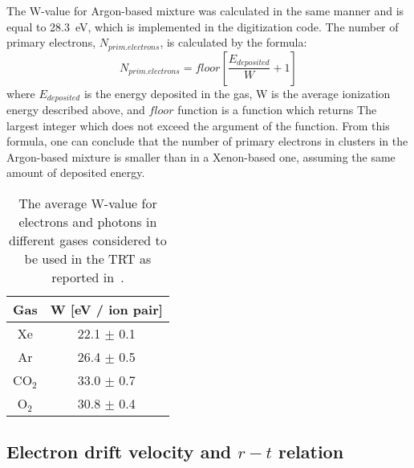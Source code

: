 The W-value for Argon-based mixture was calculated in the same manner and is equal to 28.3~eV, which is implemented in the digitization code.
The number of primary electrons, $N_{prim.electrons}$, is calculated by the formula:
\begin{equation}
 N_{prim.electrons} = floor \left[\dfrac{E_{deposited}}{W} + 1\right]
\end{equation}
where $E_{deposited}$ is the energy deposited in the gas, W is the average ionization energy described above, and $floor$ function is a function which returns
The largest integer which does not exceed the argument of the function.
From this formula, one can conclude that the number of primary electrons in clusters in the Argon-based mixture is smaller than in a Xenon-based one, 
assuming the same amount of deposited energy.

\begin{table}[p]
  \begin{tabular}{c|c}
    Gas & W [eV / ion pair]\\
    \hline
    Xe & 22.1 $\pm$ 0.1 \\
    Ar & 26.4 $\pm$ 0.5 \\
    CO$_2$ & 33.0 $\pm$ 0.7 \\
    O$_2$ & 30.8 $\pm$ 0.4 \\
  \end{tabular}
  \caption{The average W-value for electrons and photons in different gases considered to be used in the TRT as reported in~\cite{cwetanski_thesis}.}
  \label{tab:ionization_energy}
\end{table}

\subsection{Electron drift velocity and $r-t$ relation}

